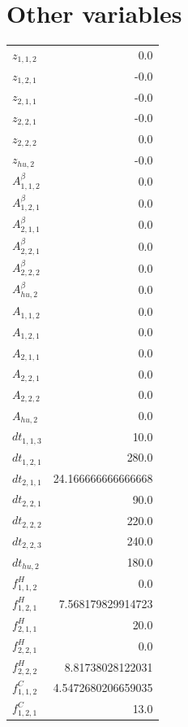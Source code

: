 \documentclass{article}%
\makeatletter
\let\mcnewpage=\newpage%
\newcommand{\TrickSupertabularIntoMulticols}{%
\renewcommand\newpage{%
\if@firstcolumn%
\hrule width\linewidth height0pt%
\columnbreak%
\else%
\mcnewpage%
\fi%
}%
}%
\makeatother
\begin{document}
\section{Other variables}%
\thispagestyle{plain}%
\begin{multicols*}{3}%
\TrickSupertabularIntoMulticols%
%
\begin{supertabular}{lr}%
	$z_{1,1,2}$ & 0.0 \\%
	$z_{1,2,1}$ & -0.0 \\%
	$z_{2,1,1}$ & -0.0 \\%
	$z_{2,2,1}$ & -0.0 \\%
	$z_{2,2,2}$ & 0.0 \\%
	$z_{hu,2}$ & -0.0 \\%
	$A_{1,1,2}^{\beta}$ & 0.0 \\%
	$A_{1,2,1}^{\beta}$ & 0.0 \\%
	$A_{2,1,1}^{\beta}$ & 0.0 \\%
	$A_{2,2,1}^{\beta}$ & 0.0 \\%
	$A_{2,2,2}^{\beta}$ & 0.0 \\%
	$A_{hu,2}^{\beta}$ & 0.0 \\%
	$A_{1,1,2}$ & 0.0 \\%
	$A_{1,2,1}$ & 0.0 \\%
	$A_{2,1,1}$ & 0.0 \\%
	$A_{2,2,1}$ & 0.0 \\%
	$A_{2,2,2}$ & 0.0 \\%
	$A_{hu,2}$ & 0.0 \\%
	$dt_{1,1,3}$ & 10.0 \\%
	$dt_{1,2,1}$ & 280.0 \\%
	$dt_{2,1,1}$ & 24.166666666666668 \\%
	$dt_{2,2,1}$ & 90.0 \\%
	$dt_{2,2,2}$ & 220.0 \\%
	$dt_{2,2,3}$ & 240.0 \\%
	$dt_{hu,2}$ & 180.0 \\%
	$f_{1,1,2}^{H}$ & 0.0 \\%
	$f_{1,2,1}^{H}$ & 7.568179829914723 \\%
	$f_{2,1,1}^{H}$ & 20.0 \\%
	$f_{2,2,1}^{H}$ & 0.0 \\%
	$f_{2,2,2}^{H}$ & 8.81738028122031 \\%
	$f_{1,1,2}^{C}$ & 4.5472680206659035 \\%
	$f_{1,2,1}^{C}$ & 13.0 \\%

\end{supertabular}
\end{multicols*}
\end{document}
